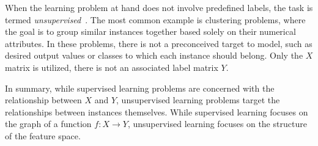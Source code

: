 
When the learning problem at hand does not involve predefined labels, the task is termed \emph{unsupervised}~\cite[p.~486]{hastie2001elements}. The most common example is clustering problems, where the goal is to group similar instances together based solely on their numerical attributes. In these problems, there is not a preconceived target to model, such as desired output values or classes to which each instance should belong. Only the $X$ matrix is utilized, there is not an associated label matrix $Y$.

In summary, while supervised learning problems are concerned with the relationship between $X$ and $Y$, unsupervised learning problems target the relationships between instances themselves.
While supervised learning focuses on the graph of a function $f: X \to Y$, unsupervised learning focuses on the structure of the feature space.

